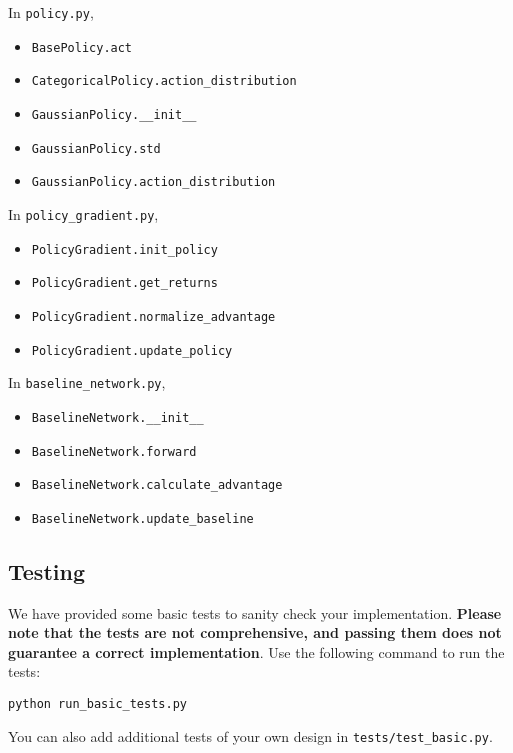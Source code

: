 \documentclass{article}
\begin{document}
In \texttt{policy.py},
\begin{itemize}
\item \texttt{BasePolicy.act}
\item \texttt{CategoricalPolicy.action\_distribution}
\item \texttt{GaussianPolicy.\_\_init\_\_}
\item \texttt{GaussianPolicy.std}
\item \texttt{GaussianPolicy.action\_distribution}
\end{itemize}

In \texttt{policy\_gradient.py},
\begin{itemize}
\item \texttt{PolicyGradient.init\_policy}
\item \texttt{PolicyGradient.get\_returns}
\item \texttt{PolicyGradient.normalize\_advantage}
\item \texttt{PolicyGradient.update\_policy}
\end{itemize}

In \texttt{baseline\_network.py},
\begin{itemize}
\item \texttt{BaselineNetwork.\_\_init\_\_}
\item \texttt{BaselineNetwork.forward}
\item \texttt{BaselineNetwork.calculate\_advantage}
\item \texttt{BaselineNetwork.update\_baseline}
\end{itemize}

\subsection{Testing}
We have provided some basic tests to sanity check your implementation. \textbf{Please note that the tests are not comprehensive, and passing them does not guarantee a correct implementation}. Use the following command to run the tests:
\begin{tcolorbox}
\begin{verbatim}
python run_basic_tests.py
\end{verbatim}
\end{tcolorbox}
You can also add additional tests of your own design in \texttt{tests/test\_basic.py}.
\end{document}
